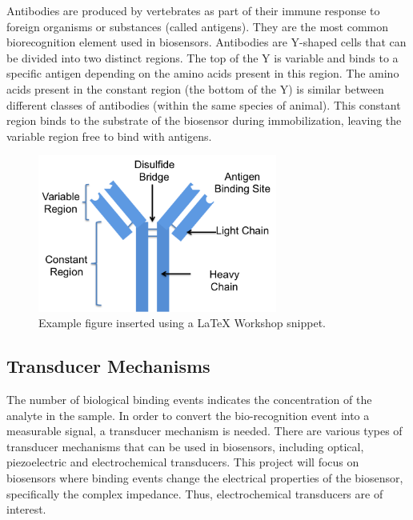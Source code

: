 Antibodies are produced by vertebrates as part of their immune response to foreign organisms or substances (called antigens). They are the most common biorecognition element used in biosensors.\cite{zengRecombinantAntibodiesTheir2012} Antibodies are Y-shaped cells that can be divided into two distinct regions. The top of the Y is variable and binds to a specific antigen depending on the amino acids present in this region. The amino acids present in the constant region (the bottom of the Y) is similar between different classes of antibodies (within the same species of animal).\cite{zengRecombinantAntibodiesTheir2012} This constant region binds to the substrate of the biosensor during immobilization, leaving the variable region free to bind with antigens.\cite{suedaAntibodyImmobilizationImmunosensing2022a}
\begin{figure}[ht]
    \centering
    \includegraphics[width=0.7\textwidth]{antibody.png}
    \caption{Example figure inserted using a LaTeX Workshop snippet.}
    \label{fig:antibody}
\end{figure}

\subsection{Transducer Mechanisms}
The number of biological binding events indicates the concentration of the analyte in the sample. In order to convert the bio-recognition event into a measurable signal, a transducer mechanism is needed\cite{bhallaIntroductionBiosensors2016}. There are various types of transducer mechanisms that can be used in biosensors, including optical, piezoelectric and electrochemical transducers. This project will focus on biosensors where binding events change the electrical properties of the biosensor, specifically the complex impedance. Thus, electrochemical transducers are of interest. 

